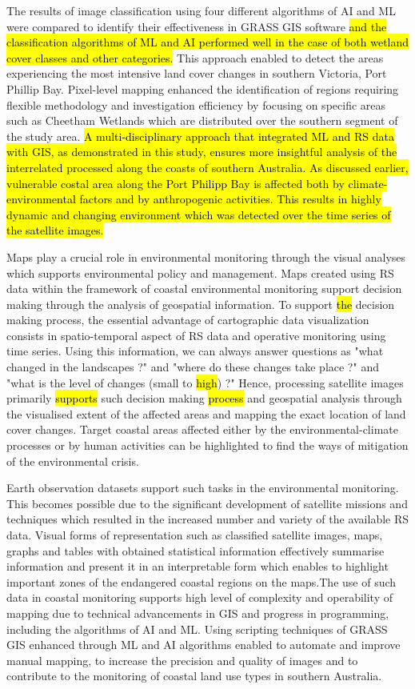 \documentclass[jmse,article,submit,pdftex,moreauthors]{Definitions/mdpi}
\begin{document}
The results of image classification using four different algorithms of AI and ML were compared to identify their effectiveness in GRASS GIS software \hl{and the classification algorithms of ML and AI performed well in the case of both wetland cover classes and other categories.} This approach enabled to detect the areas experiencing the most intensive land cover changes in southern Victoria, Port Phillip Bay. Pixel-level mapping enhanced the identification of regions requiring flexible methodology and investigation efficiency by focusing on specific areas such as Cheetham Wetlands which are distributed over the southern segment of the study area. \hl{A multi-disciplinary approach that integrated ML and RS data with GIS, as demonstrated in this study, ensures more insightful analysis of the interrelated processed along the coasts of southern Australia. As discussed earlier, vulnerable costal area along the Port Philipp Bay is affected both by climate-environmental factors and by anthropogenic activities. This results in highly dynamic and changing environment which was detected over the time series of the satellite images. }

Maps play a crucial role in environmental monitoring through the visual analyses which supports environmental policy and management. Maps created using RS data within the framework of coastal environmental monitoring support decision making through the analysis of geospatial information. To support \hl{the }decision making process, the essential advantage of cartographic data visualization consists in spatio-temporal aspect of RS data and operative monitoring using time series. Using this information, we can always answer questions as "what changed in the landscapes ?" and "where do these changes take place ?" and "what is the level of changes (small to \hl{high}) ?" Hence, processing satellite images primarily \hl{supports} such decision making \hl{process }and geospatial analysis through the visualised extent of the affected areas and mapping the exact location of land cover changes. Target coastal areas affected either by the environmental-climate processes or by human activities can be highlighted to find the ways of mitigation of the environmental crisis. 

Earth observation datasets support such tasks in the environmental monitoring. This becomes possible due to the significant development of satellite missions and techniques which resulted in the increased number and variety of the available RS data. Visual forms of representation such as classified satellite images, maps, graphs and tables with obtained statistical information effectively summarise information and present it in an interpretable form which enables to highlight important zones of the endangered coastal regions on the maps.The use of such data in coastal monitoring supports high level of complexity and operability of mapping due to technical advancements in GIS and progress in programming, including the algorithms of AI and ML. Using scripting techniques of GRASS GIS enhanced through ML and AI algorithms enabled to automate and improve manual mapping, to increase the precision and quality of images and to contribute to the monitoring of coastal land use types in southern Australia. 
\end{document}
